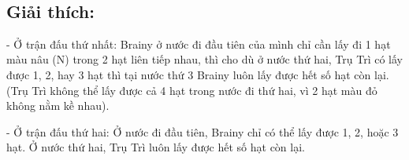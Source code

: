  

\subsection{Giải thích:}

- Ở trận đấu thứ nhất: Brainy ở nước đi đầu tiên của mình chỉ cần lấy đi 1 hạt màu nâu (N) trong 2 hạt liên tiếp nhau, thì cho dù ở nước thứ hai, Trụ Trì có lấy được 1, 2, hay 3 hạt thì tại nước thứ 3 Brainy luôn lấy được hết số hạt còn lại. (Trụ Trì không thể lấy được cả 4 hạt trong nước đi thứ hai, vì 2 hạt màu đỏ không nằm kề nhau).

- Ở trận đấu thứ hai: Ở nước đi đầu tiên, Brainy chỉ có thể lấy được 1, 2, hoặc 3 hạt. Ở nước thứ hai, Trụ Trì luôn lấy được hết số hạt còn lại.